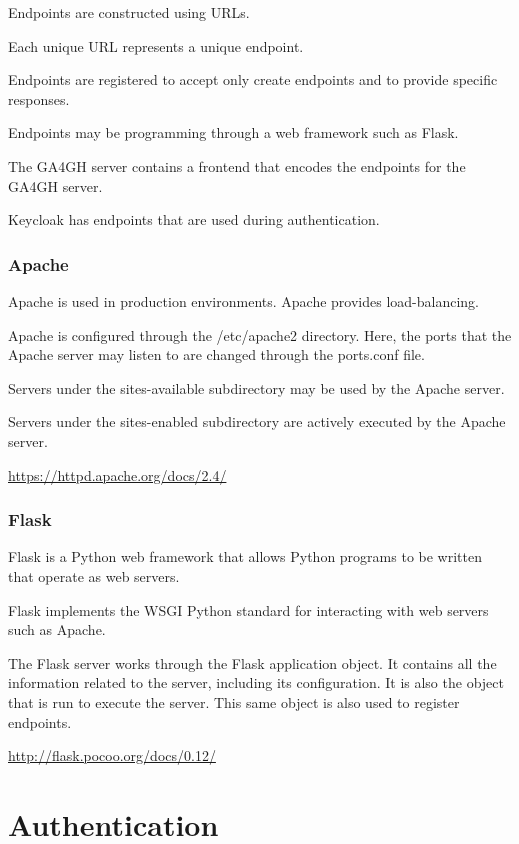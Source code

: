 \documentclass{article}
\begin{document}
Endpoints are constructed using URLs.

Each unique URL represents a unique endpoint.

Endpoints are registered to accept only create endpoints
and to provide specific responses.

Endpoints may be programming through a web framework such as Flask.

The GA4GH server contains a frontend that encodes the endpoints
for the GA4GH server.

Keycloak has endpoints that are used during authentication.


\subsubsection{Apache}

Apache is used in production environments.
Apache provides load-balancing.

Apache is configured through the /etc/apache2 directory.
Here, the ports that the Apache server may listen to
are changed through the ports.conf file.

Servers under the sites-available subdirectory
may be used by the Apache server.

Servers under the sites-enabled subdirectory
are actively executed by the Apache server.

\url{https://httpd.apache.org/docs/2.4/}

\subsubsection{Flask}

Flask is a Python web framework that allows
Python programs to be written that operate as web servers.

Flask implements the WSGI Python standard for interacting
with web servers such as Apache.

The Flask server works through the Flask application object. 
It contains all the information related to the server, including
its configuration.
It is also the object that is run to execute the server.
This same object is also used to register endpoints.

\url{http://flask.pocoo.org/docs/0.12/}

\section{Authentication}
\end{document}
